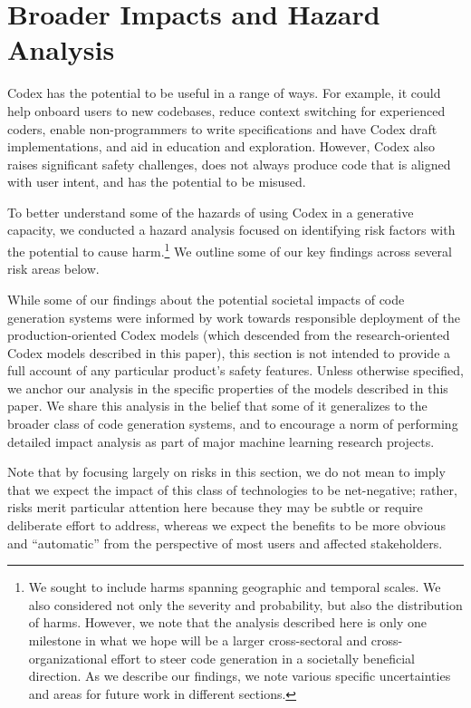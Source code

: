 \section{Broader Impacts and Hazard Analysis}
\label{sec:impacts}

Codex has the potential to be useful in a range of ways. For example, it could help onboard users to new codebases, reduce context switching for experienced coders, enable non-programmers to write specifications and have Codex draft implementations, and aid in education and exploration. However, Codex also raises significant safety challenges, does not always produce code that is aligned with user intent, and has the potential to be misused.

To better understand some of the hazards of using Codex in a generative capacity, we conducted a hazard analysis focused on identifying risk factors \citep{riskmatrix} with the potential to cause harm.\footnote{We sought to include harms spanning geographic and temporal scales. We also considered not only the severity and probability, but also the distribution of harms. However, we note that the analysis described here is only one milestone in what we hope will be a larger cross-sectoral and cross-organizational effort to steer code generation in a societally beneficial direction. As we describe our findings, we note various specific uncertainties and areas for future work in different sections.} We outline some of our key findings across several risk areas below. 

While some of our findings about the potential societal impacts of code generation systems were informed by work towards responsible deployment of the production-oriented Codex models (which descended from the research-oriented Codex models described in this paper), this section is not intended to provide a full account of any particular product's safety features. Unless otherwise specified, we anchor our analysis in the specific properties of the models described in this paper. We share this analysis in the belief that some of it generalizes to the broader class of code generation systems, and to encourage a norm of performing detailed impact analysis as part of major machine learning research projects. 

Note that by focusing largely on risks in this section, we do not mean to imply that we expect the impact of this class of technologies to be net-negative; rather, risks merit particular attention here because they may be subtle or require deliberate effort to address, whereas we expect the benefits to be more obvious and ``automatic'' from the perspective of most users and affected stakeholders. 

